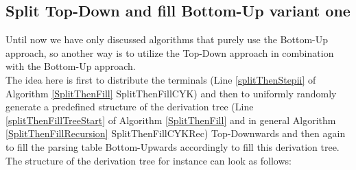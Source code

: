 \pagebreak
\subsection{Split Top-Down and fill Bottom-Up variant one}
Until now we have only discussed algorithms that purely use the Bottom-Up approach, so another way is to utilize the Top-Down approach in combination with the Bottom-Up approach.\\
The idea here is first to distribute the terminals (Line \ref{splitThenStepii} of Algorithm \ref{SplitThenFill} SplitThenFillCYK) and then to uniformly randomly generate a predefined structure of the derivation tree (Line \ref{splitThenFillTreeStart} of Algorithm \ref{SplitThenFill} and in general Algorithm \ref{SplitThenFillRecursion} SplitThenFillCYKRec) Top-Downwards and then again to fill the parsing table Bottom-Upwards accordingly to fill this derivation tree. The structure of the derivation tree for instance can look as follows:\\

